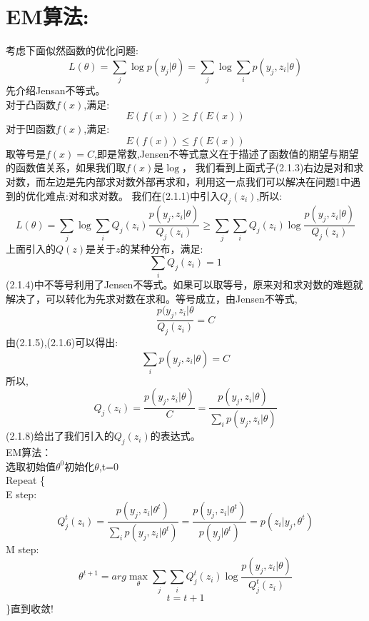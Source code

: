 \documentclass{article}
\begin{document}
\section{EM算法:}
考虑下面似然函数的优化问题:
\begin{equation}
L(\theta)=\sum_j \log p(y_j|\theta)=\sum_j \log \sum_i p(y_j,z_i|\theta) 
\tag{2.1.1}
\end{equation}
先介绍Jensan不等式。\\
对于凸函数$f(x)$,满足:
\begin{equation}
E(f(x)) \ge f(E(x)) \tag{2.1.2}
\end{equation}
对于凹函数$f(x)$,满足:
\begin{equation}
E(f(x)) \le f(E(x)) \tag{2.1.3}
\end{equation}
取等号是$f(x)=C$,即是常数,Jensen不等式意义在于描述了函数值的期望与期望的函数值关系，如果我们取$f(x)$是$\log$，
我们看到上面式子(2.1.3)右边是对和求对数，而左边是先内部求对数外部再求和，利用这一点我们可以解决在问题1中遇到的优化难点:对和求对数。
我们在(2.1.1)中引入$Q_j(z_i)$,所以:
\begin{equation}
L(\theta)=\sum_j \log \sum_i Q_j(z_i) \frac{p(y_j,z_i|\theta)}{Q_j(z_i)} \ge 
\sum_j \sum_i Q_j(z_i) \log \frac{p(y_j,z_i|\theta)}{Q_j(z_i)} \tag{2.1.4}
\end{equation}
上面引入的$Q(z)$是关于$z$的某种分布，满足:
\begin{equation}
\sum_iQ_j(z_i)=1 \tag{2.1.5}
\end{equation}
(2.1.4)中不等号利用了Jensen不等式。如果可以取等号，原来对和求对数的难题就解决了，可以转化为先求对数在求和。等号成立，由Jensen不等式,
\begin{equation}
\frac{p(y_j,z_i|\theta}{Q_j(z_i)}=C \tag{2.1.6}
\end{equation}
由(2.1.5),(2.1.6)可以得出:
\begin{equation}
\sum_ip(y_j,z_i|\theta)=C \tag{2.1.7}
\end{equation}
所以,
\begin{equation}
Q_j(z_i)=\frac{p(y_j,z_i|\theta)}{C}=\frac{p(y_j,z_i|\theta)}{\sum_ip(y_j,z_i| \theta)} \tag{2.1.8}
\end{equation}
(2.1.8)给出了我们引入的$Q_j(z_i)$的表达式。\\
EM算法：\\
选取初始值$\theta^0$初始化$\theta$,t=0 \\
Repeat \{\\
E step:\\
\begin{equation}
Q_j^t(z_i)=\frac{p(y_j,z_i|\theta^t)}{\sum_ip(y_j,z_i|\theta^t)}=\frac{p(y_j,z_i|\theta^t)}{p(y_j|\theta^t)}=p(z_i|y_j,\theta^t) \tag{2.1.9}
\end{equation}
M step:
\begin{equation}
\theta^{t+1} = arg \max_{\theta} \sum_j \sum_i Q_j^t(z_i) \log \frac{p(y_j,z_i|\theta)}{Q_j^t(z_i)}  \tag{2.1.10}
\end{equation}
\begin{equation}
t = t+1 \tag{2.1.11}
\end{equation}
\}直到收敛!
\end{document}
